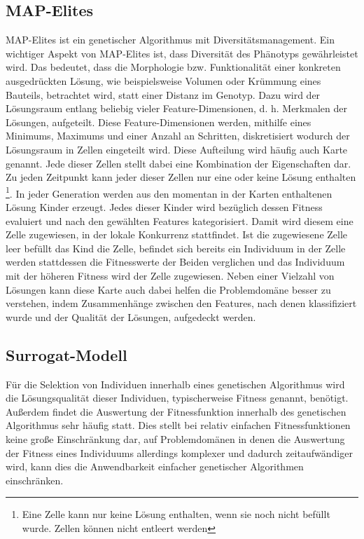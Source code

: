 \documentclass[12pt]{article}
\begin{document}
\subsection{MAP-Elites}
\label{sub:mapElites}
MAP-Elites \cite{Mouret.4202015} ist ein genetischer Algorithmus mit Diversitätsmanagement.
Ein wichtiger Aspekt von MAP-Elites ist, dass Diversität des Phänotyps gewährleistet wird.
Das bedeutet, dass die Morphologie bzw. Funktionalität einer konkreten ausgedrückten Lösung, wie beispielsweise Volumen oder Krümmung eines Bauteils, betrachtet wird, statt einer Distanz im Genotyp.
Dazu wird der Lösungsraum entlang beliebig vieler Feature-Dimensionen, d. h. Merkmalen der Lösungen, aufgeteilt.
Diese Feature-Dimensionen werden, mithilfe eines Minimums, Maximums und einer Anzahl an Schritten, diskretisiert wodurch der Lösungsraum in Zellen eingeteilt wird.
Diese Aufteilung wird häufig auch Karte genannt.
Jede dieser Zellen stellt dabei eine Kombination der Eigenschaften dar.
Zu jeden Zeitpunkt kann jeder dieser Zellen nur eine oder keine Lösung enthalten
\footnote{Eine Zelle kann nur keine Lösung enthalten, wenn sie noch nicht befüllt wurde. Zellen können nicht entleert werden}.
In jeder Generation werden aus den momentan in der Karten enthaltenen Lösung Kinder erzeugt.
Jedes dieser Kinder wird bezüglich dessen Fitness evaluiert und nach den gewählten Features kategorisiert.
Damit wird diesem eine Zelle zugewiesen, in der lokale Konkurrenz stattfindet.
Ist die zugewiesene Zelle leer befüllt das Kind die Zelle, befindet sich bereits ein Individuum in der Zelle werden stattdessen die Fitnesswerte der Beiden verglichen und das Individuum mit der höheren Fitness wird der Zelle zugewiesen.
Neben einer Vielzahl von Lösungen kann diese Karte auch dabei helfen die Problemdomäne besser zu verstehen, indem Zusammenhänge zwischen den Features, nach denen klassifiziert wurde und der Qualität der Lösungen, aufgedeckt werden.

\subsection{Surrogat-Modell}
\label{sub:surrogate}
Für die Selektion von Individuen innerhalb eines genetischen Algorithmus wird die Lösungsqualität dieser Individuen, typischerweise Fitness genannt, benötigt.
Außerdem findet die Auswertung der Fitnessfunktion innerhalb des genetischen Algorithmus sehr häufig statt.
Dies stellt bei relativ einfachen Fitnessfunktionen keine große Einschränkung dar, auf Problemdomänen in denen die Auswertung der Fitness eines Individuums allerdings komplexer und dadurch zeitaufwändiger wird, kann dies die Anwendbarkeit einfacher genetischer Algorithmen einschränken.
\end{document}
